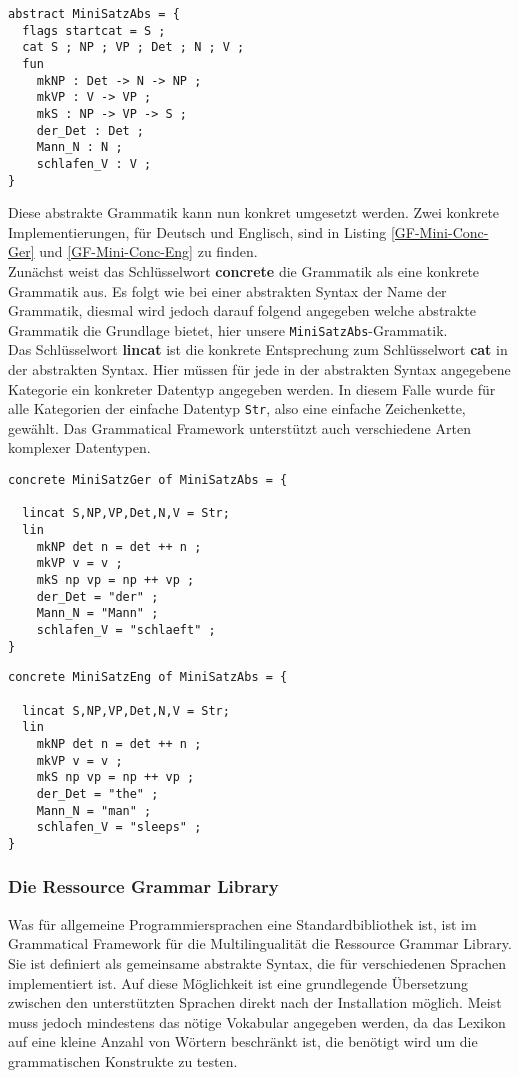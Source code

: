 \documentclass[11pt]{scrartcl}
\begin{document}
\begin{lstlisting}[float,caption={Abstrakte Syntax},label={GF-Mini-Abs}]
abstract MiniSatzAbs = {
  flags startcat = S ;
  cat S ; NP ; VP ; Det ; N ; V ;
  fun
    mkNP : Det -> N -> NP ;
    mkVP : V -> VP ;
    mkS : NP -> VP -> S ;
    der_Det : Det ;
    Mann_N : N ;
    schlafen_V : V ;
}
\end{lstlisting}
Diese abstrakte Grammatik kann nun konkret umgesetzt werden. Zwei konkrete Implementierungen, für Deutsch und Englisch, sind in Listing \ref{GF-Mini-Conc-Ger} und \ref{GF-Mini-Conc-Eng} zu finden. \\
Zunächst weist das Schlüsselwort \textbf{concrete} die Grammatik als eine konkrete Grammatik aus. Es folgt wie bei einer abstrakten Syntax der Name der Grammatik, diesmal wird jedoch darauf folgend angegeben welche abstrakte Grammatik die Grundlage bietet, hier unsere \texttt{MiniSatzAbs}-Grammatik. \\
Das Schlüsselwort \textbf{lincat} ist die konkrete Entsprechung zum Schlüsselwort \textbf{cat} in der abstrakten Syntax. Hier müssen für jede in der abstrakten Syntax angegebene Kategorie ein konkreter Datentyp angegeben werden. In diesem Falle wurde für alle Kategorien der einfache Datentyp \texttt{Str}, also eine einfache Zeichenkette, gewählt. Das Grammatical Framework unterstützt auch verschiedene Arten komplexer Datentypen.
\begin{lstlisting}[float,caption={Konkrete deutsch Syntax},label={GF-Mini-Conc-Ger}]
concrete MiniSatzGer of MiniSatzAbs = {

  lincat S,NP,VP,Det,N,V = Str;
  lin
    mkNP det n = det ++ n ;
    mkVP v = v ;           
    mkS np vp = np ++ vp ;
    der_Det = "der" ;     
    Mann_N = "Mann" ;
    schlafen_V = "schlaeft" ;
}
\end{lstlisting}
\begin{lstlisting}[float,caption={Konkrete englische Syntax},label={GF-Mini-Conc-Eng}]
concrete MiniSatzEng of MiniSatzAbs = {

  lincat S,NP,VP,Det,N,V = Str;
  lin
    mkNP det n = det ++ n ;
    mkVP v = v ;           
    mkS np vp = np ++ vp ;
    der_Det = "the" ;     
    Mann_N = "man" ;
    schlafen_V = "sleeps" ;
}
\end{lstlisting}
\subsubsection{Die Ressource Grammar Library}
Was für allgemeine Programmiersprachen eine Standardbibliothek ist, ist im Grammatical Framework für die Multilingualität die Ressource Grammar Library. Sie ist definiert als gemeinsame abstrakte Syntax, die für verschiedenen Sprachen implementiert ist. Auf diese Möglichkeit ist eine grundlegende Übersetzung zwischen den unterstützten Sprachen direkt nach der Installation möglich. Meist muss jedoch mindestens das nötige Vokabular angegeben werden, da das Lexikon auf eine kleine Anzahl von Wörtern beschränkt ist, die benötigt wird um die grammatischen Konstrukte zu testen. \\
\end{document}
